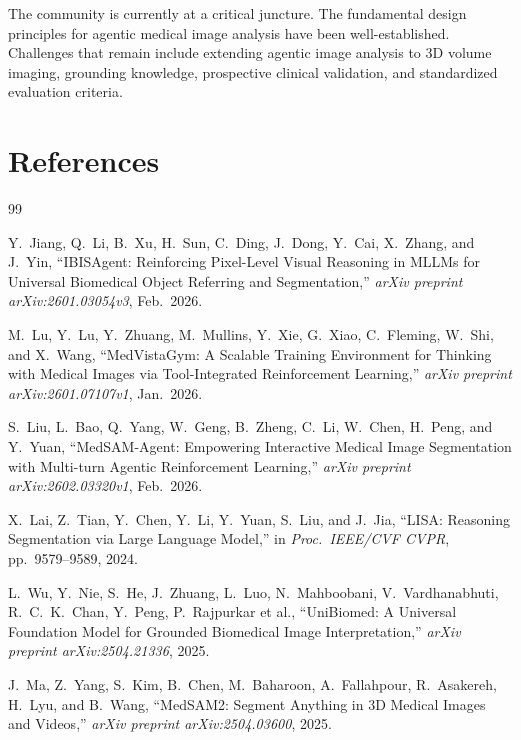 \documentclass[12pt, a4paper]{article}
\begin{document}
The community is currently at a critical juncture.
The fundamental design principles for agentic medical image analysis have been
well-established.
Challenges that remain include extending agentic image analysis to 3D volume imaging,
grounding knowledge, prospective clinical validation, and standardized evaluation
criteria.

\section*{References}

\begin{thebibliography}{99}

Y.~Jiang, Q.~Li, B.~Xu, H.~Sun, C.~Ding, J.~Dong, Y.~Cai, X.~Zhang, and J.~Yin,
``IBISAgent: Reinforcing Pixel-Level Visual Reasoning in MLLMs for Universal Biomedical
Object Referring and Segmentation,''
\textit{arXiv preprint arXiv:2601.03054v3}, Feb.~2026.

M.~Lu, Y.~Lu, Y.~Zhuang, M.~Mullins, Y.~Xie, G.~Xiao, C.~Fleming, W.~Shi, and
X.~Wang,
``MedVistaGym: A Scalable Training Environment for Thinking with Medical Images via
Tool-Integrated Reinforcement Learning,''
\textit{arXiv preprint arXiv:2601.07107v1}, Jan.~2026.

S.~Liu, L.~Bao, Q.~Yang, W.~Geng, B.~Zheng, C.~Li, W.~Chen, H.~Peng, and Y.~Yuan,
``MedSAM-Agent: Empowering Interactive Medical Image Segmentation with Multi-turn
Agentic Reinforcement Learning,''
\textit{arXiv preprint arXiv:2602.03320v1}, Feb.~2026.

X.~Lai, Z.~Tian, Y.~Chen, Y.~Li, Y.~Yuan, S.~Liu, and J.~Jia,
``LISA: Reasoning Segmentation via Large Language Model,''
in \textit{Proc.\ IEEE/CVF CVPR}, pp.~9579--9589, 2024.

L.~Wu, Y.~Nie, S.~He, J.~Zhuang, L.~Luo, N.~Mahboobani, V.~Vardhanabhuti,
R.~C.~K.~Chan, Y.~Peng, P.~Rajpurkar et al.,
``UniBiomed: A Universal Foundation Model for Grounded Biomedical Image Interpretation,''
\textit{arXiv preprint arXiv:2504.21336}, 2025.

J.~Ma, Z.~Yang, S.~Kim, B.~Chen, M.~Baharoon, A.~Fallahpour, R.~Asakereh, H.~Lyu,
and B.~Wang,
``MedSAM2: Segment Anything in 3D Medical Images and Videos,''
\textit{arXiv preprint arXiv:2504.03600}, 2025.


\end{thebibliography}
\end{document}

